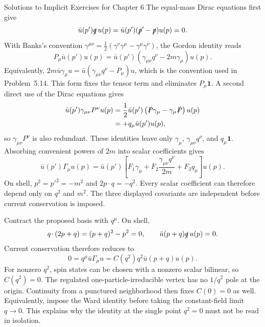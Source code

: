\begin{bankssolutions}{Solutions to Implicit Exercises for Chapter 6}
The equal-mass Dirac equations first give
\begin{equation*}
 \bar u(p')\slashed q\,u(p)
 =\bar u(p')(\slashed p'-\slashed p)u(p)=0.
\end{equation*}
With Banks's convention
\(\gamma^{\mu\nu}=\tfrac12(\gamma^\nu\gamma^\mu-
\gamma^\mu\gamma^\nu)\), the Gordon identity reads
\begin{equation*}
 P_\mu\bar u(p')u(p)
 =\bar u(p')\left(\gamma_{\mu\nu}q^\nu-2m\gamma_\mu\right)u(p).
\end{equation*}
Equivalently,
\(2m\bar u\gamma_\mu u=\bar u(\gamma_{\mu\nu}q^\nu-P_\mu)u\),
which is the convention used in Problem~5.14.  This form fixes the tensor
term and eliminates \(P_\mu\mathbf1\).  A second direct use of the Dirac
equations gives
\begin{align*}
 \bar u(p')\gamma_{\mu\nu}P^\nu u(p)
 &=\frac12\bar u(p')\left(\slashed P\gamma_\mu
 -\gamma_\mu\slashed P\right)u(p)\\
 &=+q_\mu\bar u(p')u(p),
\end{align*}
so \(\gamma_{\mu\nu}P^\nu\) is also redundant.  These identities leave only
\(\gamma_\mu\), \(\gamma_{\mu\nu}q^\nu\), and
\(q_\mu\mathbf1\).  Absorbing convenient powers of \(2m\) into scalar
coefficients gives
\begin{equation*}
 \bar u(p')\Gamma_\mu u(p)=\bar u(p')\left[
 F_1\gamma_\mu+F_2\frac{\gamma_{\mu\nu}q^\nu}{2m}
 +F_3q_\mu\right]u(p).
\end{equation*}
On shell, \(p^2=p'^2=-m^2\) and
\(2p\!\cdot q=-q^2\).  Every scalar coefficient can therefore depend
only on \(q^2\) and \(m^2\).  The three displayed covariants are independent
before current conservation is imposed.

Contract the proposed basis with \(q^\mu\).  On shell,
\begin{equation*}
 q\!\cdot(2p+q)=(p+q)^2-p^2=0,
 \qquad
 \bar u(p+q)\slashed q\,u(p)=0.
\end{equation*}
Current conservation therefore reduces to
\begin{equation*}
 0=q^\mu\bar u\Gamma_\mu u
 =C(q^2)q^2\bar u(p+q)u(p).
\end{equation*}
For nonzero \(q^2\), spin states can be chosen with a nonzero scalar
bilinear, so \(C(q^2)=0\).  The regulated one-particle-irreducible vertex
has no \(1/q^2\) pole at the origin.  Continuity from a punctured
neighborhood then fixes \(C(0)=0\) as well.  Equivalently, impose the Ward
identity before taking the constant-field limit \(q\to0\).  This explains
why the identity at the single point \(q^2=0\) must not be read in
isolation.


\end{bankssolutions}
